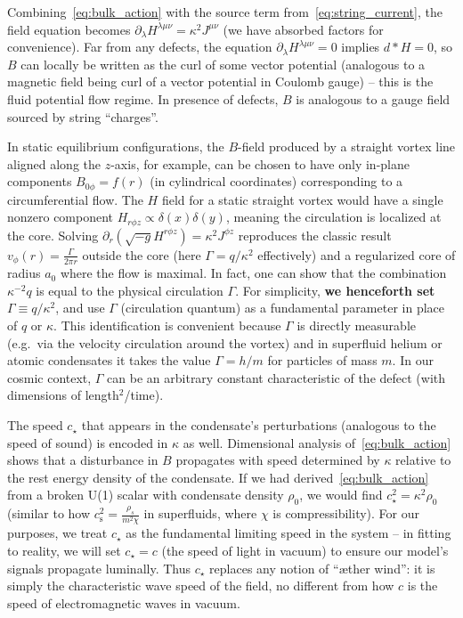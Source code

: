 \documentclass[12pt]{article}
\begin{document}
Combining~\eqref{eq:bulk_action} with the source term from~\eqref{eq:string_current}, the field equation becomes $\partial_\lambda H^{\lambda\mu\nu} = \kappa^2 J^{\mu\nu}$ (we have absorbed factors for convenience). Far from any defects, the equation $\partial_\lambda H^{\lambda\mu\nu}=0$ implies $d*H=0$, so $B$ can locally be written as the curl of some vector potential (analogous to a magnetic field being curl of a vector potential in Coulomb gauge) -- this is the fluid potential flow regime. In presence of defects, $B$ is analogous to a gauge field sourced by string ``charges''.

In static equilibrium configurations, the $B$-field produced by a straight vortex line aligned along the $z$-axis, for example, can be chosen to have only in-plane components $B_{0\phi}= f(r)$ (in cylindrical coordinates) corresponding to a circumferential flow. The $H$ field for a static straight vortex would have a single nonzero component $H_{r\phi z} \propto \delta(x)\delta(y)$, meaning the circulation is localized at the core. Solving $\partial_r(\sqrt{-g} H^{r\phi z}) = \kappa^2 J^{\phi z}$ reproduces the classic result $v_\phi(r) = \frac{\Gamma}{2\pi r}$ outside the core (here $\Gamma = q/\kappa^2$ effectively) and a regularized core of radius $a_0$ where the flow is maximal. In fact, one can show that the combination $\kappa^{-2} q$ is equal to the physical circulation $\Gamma$. For simplicity, \textbf{we henceforth set $\Gamma \equiv q/\kappa^2$}, and use $\Gamma$ (circulation quantum) as a fundamental parameter in place of $q$ or $\kappa$. This identification is convenient because $\Gamma$ is directly measurable (e.g.\ via the velocity circulation around the vortex) and in superfluid helium or atomic condensates it takes the value $\Gamma = h/m$ for particles of mass $m$. In our cosmic context, $\Gamma$ can be an arbitrary constant characteristic of the defect (with dimensions of length${}^2$/time).

The speed $c_\star$ that appears in the condensate's perturbations (analogous to the speed of sound) is encoded in $\kappa$ as well. Dimensional analysis of~\eqref{eq:bulk_action} shows that a disturbance in $B$ propagates with speed determined by $\kappa$ relative to the rest energy density of the condensate. If we had derived~\eqref{eq:bulk_action} from a broken U(1) scalar with condensate density $\rho_0$, we would find $c_\star^2 = \kappa^2 \rho_0$ (similar to how $c_{\text{s}}^2 = \frac{\rho_s}{m^2\chi}$ in superfluids, where $\chi$ is compressibility). For our purposes, we treat $c_\star$ as the fundamental limiting speed in the system -- in fitting to reality, we will set $c_\star = c$ (the speed of light in vacuum) to ensure our model's signals propagate luminally. Thus $c_\star$ replaces any notion of ``æther wind'': it is simply the characteristic wave speed of the field, no different from how $c$ is the speed of electromagnetic waves in vacuum.
\end{document}
